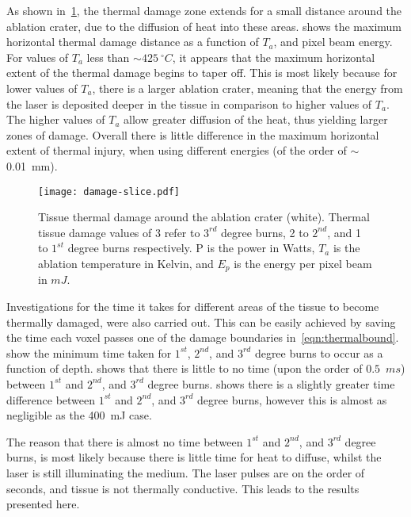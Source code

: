 As shown in~\cref{fig:damfig}, the thermal damage zone extends for a small distance around the ablation crater, due to the diffusion of heat into these areas.  shows the maximum horizontal thermal damage distance as a function of $T_a$, and pixel beam energy. For values of $T_a$ less than $\sim 425~^{\circ}C$, it appears that the maximum horizontal extent of the thermal damage begins to taper off. This is most likely because for lower values of $T_a$, there is a larger ablation crater, meaning that the energy from the laser is deposited deeper in the tissue in comparison to higher values of $T_a$. The higher values of $T_a$ allow greater diffusion of the heat, thus yielding larger zones of damage. Overall there is little difference in the maximum horizontal extent of thermal injury, when using different energies (of the order of $\sim$ 0.01~mm).



\begin{figure}[!htbp]
	\centering
	\texttt{[image: damage-slice.pdf]}
	\caption{Tissue thermal damage around the ablation crater (white). Thermal tissue damage values of 3 refer to $3^{rd}$ degree burns, 2 to $2^{nd}$, and 1 to $1^{st}$ degree burns respectively. P is the power in Watts, $T_a$ is the ablation temperature in Kelvin, and $E_p$ is the energy per pixel beam in $mJ$.}
	\label{fig:damfig}
\end{figure}

Investigations for the time it takes for different areas of the tissue to become thermally damaged, were also carried out. This can be easily achieved by saving the time each voxel passes one of the damage boundaries in~\cref{eqn:thermalbound}.~ show the minimum time taken for $1^{st}$, $2^{nd}$, and $3^{rd}$ degree burns to occur as a function of depth.  shows that there is little to no time (upon the order of $0.5$~$ms$) between $1^{st}$ and $2^{nd}$, and $3^{rd}$ degree burns.
 shows there is a slightly greater time difference between $1^{st}$ and $2^{nd}$, and $3^{rd}$ degree burns, however this is almost as negligible as the 400~mJ case.

The reason that there is almost no time between $1^{st}$ and $2^{nd}$, and $3^{rd}$ degree burns, is most likely because there is little time for heat to diffuse, whilst the laser is still illuminating the medium. The laser pulses are on the order of seconds, and tissue is not thermally conductive. This leads to the results presented here.


